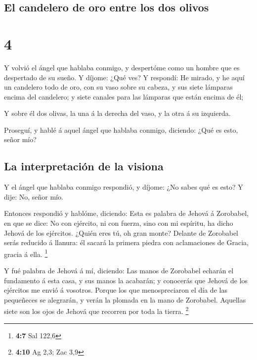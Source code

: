\hypertarget{el-candelero-de-oro-entre-los-dos-olivos}{%
\subsection{El candelero de oro entre los dos
olivos}\label{el-candelero-de-oro-entre-los-dos-olivos}}

\hypertarget{section-3}{%
\section{4}\label{section-3}}

 Y volvió el ángel que hablaba conmigo, y despertóme como un
hombre que es despertado de su sueño.  Y díjome: ¿Qué ves? Y
respondí: He mirado, y he aquí un candelero todo de oro, con su vaso
sobre su cabeza, y sus siete lámparas encima del candelero; y siete
canales para las lámparas que están encima de él;

 Y sobre él dos olivas, la una á la derecha del vaso, y la
otra á su izquierda.

 Proseguí, y hablé á aquel ángel que hablaba conmigo,
diciendo: ¿Qué es esto, señor mío?

\hypertarget{la-interpretaciuxf3n-de-la-visiona}{%
\subsection{La interpretación de la
visiona}\label{la-interpretaciuxf3n-de-la-visiona}}

 Y el ángel que hablaba conmigo respondió, y díjome: ¿No
sabes qué es esto? Y dije: No, señor mío.

 Entonces respondió y hablóme, diciendo: Esta es palabra de
Jehová á Zorobabel, en que se dice: No con ejército, ni con fuerza, sino
con mi espíritu, ha dicho Jehová de los ejércitos.  ¿Quién
eres tú, oh gran monte? Delante de Zorobabel serás reducido á llanura:
él sacará la primera piedra con aclamaciones de Gracia, gracia á ella.
\footnote{\textbf{4:7} Sal 122,6}

 Y fué palabra de Jehová á mí, diciendo:  Las
manos de Zorobabel echarán el fundamento á esta casa, y sus manos la
acabarán; y conocerás que Jehová de los ejércitos me envió á vosotros.
 Porque los que menospreciaron el día de las pequeñeces se
alegrarán, y verán la plomada en la mano de Zorobabel. Aquellas siete
son los ojos de Jehová que recorren por toda la tierra. \footnote{\textbf{4:10}
  Ag 2,3; Zac 3,9}

